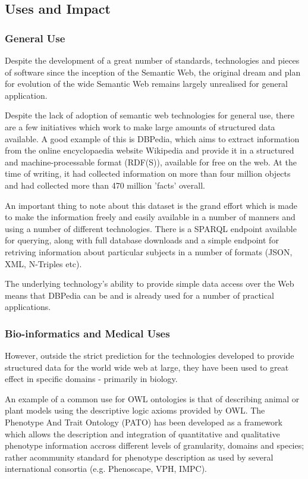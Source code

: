 \documentclass{article}
\begin{document}
\subsection{Uses and Impact}

\subsubsection{General Use}

Despite the development of a great number of standards, technologies and pieces
of software since the inception of the Semantic Web, the original
dream and plan for evolution of the wide Semantic Web remains largely unrealised
for general application.\cite{semweb}

Despite the lack of adoption of semantic web technologies for general use, there
are a few initiatives which work to make large amounts of structured data
available. A good example of this is DBPedia, which aims to extract
information from the online encyclopaedia website Wikipedia and provide it in a
structured and machine-processable format (RDF(S)), available for free on the 
web. At the time of writing, it had collected information on more than four 
million objects and had collected more than 470 million 'facts' overall.

An important thing to note about this dataset is the grand effort which is made
to make the information freely and easily available in a number of manners and
using a number of different technologies. There is a SPARQL endpoint available
for querying, along with full database downloads and a simple endpoint for
retriving information about particular subjects in a number of formats (JSON,
XML, N-Triples etc).

The underlying technology's ability to provide simple data access over the Web
means that DBPedia can be and is already used for a number of practical
applications.\cite{dbpedia-uses}

\subsubsection{Bio-informatics and Medical Uses}

However, outside the strict prediction for the technologies developed to provide
structured data for the world wide web at large, they have been used to great
effect in specific domains - primarily in biology.

An example of a common use for OWL ontologies is that of describing animal or
plant models using the descriptive logic axioms provided by OWL. The Phenotype
And Trait Ontology (PATO) has been developed as a framework which allows the
description and integration of quantitative and qualitative phenotype
information accross different levels of granularity, domains and
species\cite{pato}; rather acommunity standard for phenotype description as
used by several international consortia (e.g. Phenoscape\cite{phenoscape},
VPH\cite{vph}, IMPC\cite{impc}).
\end{document}
